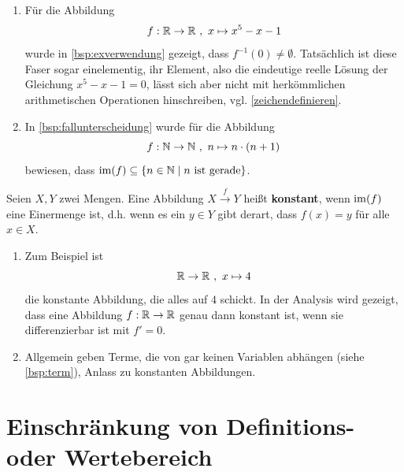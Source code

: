 \begin{bsp}[*] \quad
    \begin{enumerate}
        \item Für die Abbildung
            \[ f : \R \to \R \ ,\ x\mapsto x^5-x-1 \]
        wurde in \cref{bsp:exverwendung} gezeigt, dass $f^{-1}(0)\neq\emptyset$. Tatsächlich ist diese Faser sogar einelementig, ihr Element, also die eindeutige reelle Lösung der Gleichung $x^5-x-1=0$, lässt sich aber nicht mit herkömmlichen arithmetischen Operationen hinschreiben, vgl. \cref{zeichendefinieren}.
        \item In \cref{bsp:fallunterscheidung} wurde für die Abbildung
            \[ f : \N \to \N \ ,\ n \mapsto n\cdot (n+1) \]
        bewiesen, dass $\operatorname{im}(f)\subseteq \{n\in \mathbb N\mid n\ \text{ist gerade}\}$.
    \end{enumerate}
\end{bsp}


\begin{defin} 
    Seien $X,Y$ zwei Mengen. Eine Abbildung $X\xrightarrow{f} Y$ heißt \textbf{konstant}, wenn $\operatorname{im}(f)$ eine Einermenge ist, d.h. wenn es ein $y\in Y$ gibt derart, dass $f(x)=y$ für alle $x\in X$.
\end{defin}


\begin{bsp} \quad
    \begin{enumerate}
        \item Zum Beispiel ist
            \[ \R \to \R \ ,\ x\mapsto 4 \]
        die konstante Abbildung, die alles auf $4$ schickt. In der Analysis wird gezeigt, dass eine Abbildung $f : \mathbb R\to \mathbb R$ genau dann konstant ist, wenn sie differenzierbar ist mit $f'=0$.
        \item Allgemein geben Terme, die von gar keinen Variablen abhängen (siehe \cref{bsp:term}), Anlass zu konstanten Abbildungen.
    \end{enumerate}
\end{bsp}





\section{Einschränkung von Definitions- oder Wertebereich}


